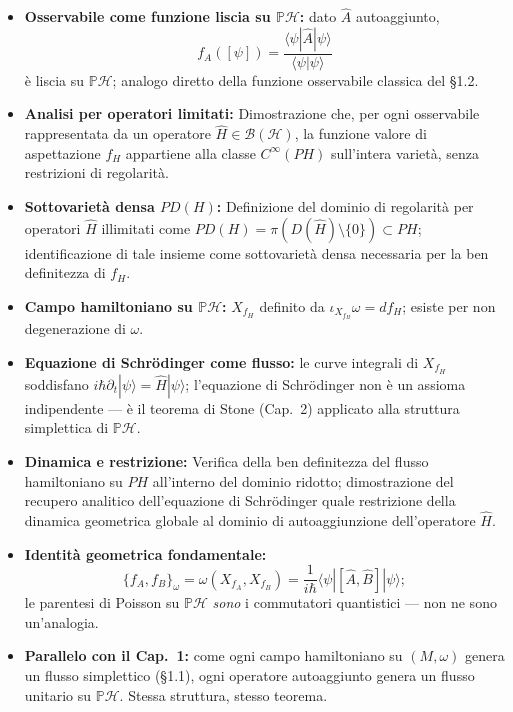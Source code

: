 \documentclass[12pt, a4paper]{article}
\begin{document}
	\begin{itemize}
		\item \textbf{Osservabile come funzione liscia su $\mathbb{P}\mathcal{H}$:} dato
		$\hat{A}$ autoaggiunto, $$f_A([\psi]) = \frac{\langle\psi|\hat{A}|\psi\rangle}{\langle\psi|\psi\rangle}$$
		è liscia su $\mathbb{P}\mathcal{H}$; analogo diretto della funzione osservabile
		classica del §1.2.
		
		\item \textbf{Analisi per operatori limitati:} Dimostrazione che, per ogni osservabile rappresentata da un operatore $\hat{H} \in \mathcal{B}(\mathcal{H})$, la funzione valore di aspettazione $f_H$ appartiene alla classe $C^\infty(PH)$ sull'intera varietà, senza restrizioni di regolarità.
		
		\item \textbf{Sottovarietà densa $PD(H)$:} Definizione del dominio di regolarità per operatori $\hat{H}$ illimitati come $PD(H) = \pi(D(\hat{H}) \setminus \{0\}) \subset PH$; identificazione di tale insieme come sottovarietà densa necessaria per la ben definitezza di $f_H$.
		
		\item \textbf{Campo hamiltoniano su $\mathbb{P}\mathcal{H}$:} $X_{f_H}$ definito da
		$\iota_{X_{f_H}}\omega = df_H$; esiste per non degenerazione di $\omega$.
		\item \textbf{Equazione di Schrödinger come flusso:} le curve integrali di $X_{f_H}$
		soddisfano $i\hbar\partial_t|\psi\rangle = \hat{H}|\psi\rangle$; l'equazione di
		Schrödinger non è un assioma indipendente --- è il teorema di Stone (Cap.\ 2)
		applicato alla struttura simplettica di $\mathbb{P}\mathcal{H}$.
		
		\item \textbf{Dinamica e restrizione:} Verifica della ben definitezza del flusso hamiltoniano su $PH$ all'interno del dominio ridotto; dimostrazione del recupero analitico dell'equazione di Schrödinger quale restrizione della dinamica geometrica globale al dominio di autoaggiunzione dell'operatore $\hat{H}$.
		
		\item \textbf{Identità geometrica fondamentale:}
		\[
		\{f_A, f_B\}_\omega = \omega(X_{f_A}, X_{f_B}) = \frac{1}{i\hbar}
		\langle\psi|[\hat{A},\hat{B}]|\psi\rangle;
		\]
		le parentesi di Poisson su $\mathbb{P}\mathcal{H}$ \emph{sono} i commutatori
		quantistici --- non ne sono un'analogia.
		\item \textbf{Parallelo con il Cap.\ 1:} come ogni campo hamiltoniano su $(M,\omega)$
		genera un flusso simplettico (§1.1), ogni operatore autoaggiunto genera un flusso
		unitario su $\mathbb{P}\mathcal{H}$. Stessa struttura, stesso teorema.
	\end{itemize}
\end{document}
